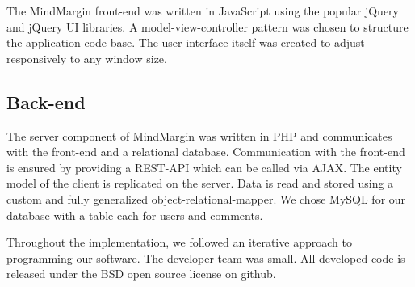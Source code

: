 The MindMargin front-end was written in JavaScript using the popular jQuery and jQuery UI libraries. A model-view-controller pattern was chosen to structure the application code base. The user interface itself was created to adjust responsively to any window size.

\subsection{Back-end}
The server component of MindMargin was written in PHP and communicates with the front-end and a relational database. Communication with the front-end is ensured by providing a REST-API which can be called via AJAX. The entity model of the client is replicated on the server. Data is read and stored using a custom and fully generalized object-relational-mapper. We chose MySQL for our database with a table each for users and comments.

Throughout the implementation, we followed an iterative approach to programming our software. The developer team was small. All developed code is released under the BSD open source license on github.